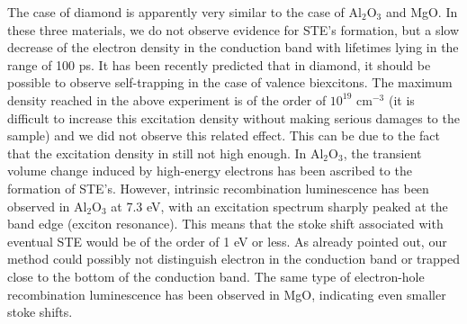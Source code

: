 \documentclass[aps,prb,reprint]{revtex4-2}
\begin{document}
The case of diamond is apparently very similar to the case of Al$_2$O$_3$ and MgO.\cite{6} In these three materials, we do not observe evidence for STE's formation, but a slow decrease of the electron density in the conduction band with lifetimes lying in the range of 100 ps. It has been recently predicted that in diamond, it should be possible to observe self-trapping in the case of valence biexcitons.\cite{37} The maximum density reached in the above experiment is of the order of $10^{19}$ cm$^{-3}$ (it is difficult to increase this excitation density without making serious damages to the sample) and we did not observe this related effect. This can be due to the fact that the excitation density in still not high enough. In Al$_2$O$_3$, the transient volume change induced by high-energy electrons has been ascribed to the formation of STE's.\cite{38} However, intrinsic recombination luminescence has been observed in Al$_2$O$_3$ at 7.3 eV,\cite{39} with an excitation spectrum sharply peaked at the band edge (exciton resonance).\cite{40} This means that the stoke shift associated with eventual STE would be of the order of 1 eV or less. As already pointed out, our method could possibly not distinguish electron in the conduction band or trapped close to the bottom of the conduction band. The same type of electron-hole recombination luminescence has been observed in MgO, indicating even smaller stoke shifts.\cite{41}
\end{document}
